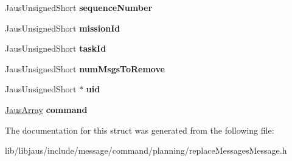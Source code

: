 \begin{DoxyCompactItemize}
\item 
\hypertarget{struct_replace_message_struct_ae1bb4943b97c73cb176e182298aaf50b}{\-Jaus\-Unsigned\-Short {\bfseries sequence\-Number}}\label{struct_replace_message_struct_ae1bb4943b97c73cb176e182298aaf50b}

\item 
\hypertarget{struct_replace_message_struct_a8dae45a6f79a463b52ede4d6227161a1}{\-Jaus\-Unsigned\-Short {\bfseries mission\-Id}}\label{struct_replace_message_struct_a8dae45a6f79a463b52ede4d6227161a1}

\item 
\hypertarget{struct_replace_message_struct_a88e5b48ac7c35fa597f0897cd65849b2}{\-Jaus\-Unsigned\-Short {\bfseries task\-Id}}\label{struct_replace_message_struct_a88e5b48ac7c35fa597f0897cd65849b2}

\item 
\hypertarget{struct_replace_message_struct_acf9e36b2a16694d00946b3d9d5988cbc}{\-Jaus\-Unsigned\-Short {\bfseries num\-Msgs\-To\-Remove}}\label{struct_replace_message_struct_acf9e36b2a16694d00946b3d9d5988cbc}

\item 
\hypertarget{struct_replace_message_struct_a9a5283f311e84e44daa6890b6cd9d042}{\-Jaus\-Unsigned\-Short $\ast$ {\bfseries uid}}\label{struct_replace_message_struct_a9a5283f311e84e44daa6890b6cd9d042}

\item 
\hypertarget{struct_replace_message_struct_a58a6da15a0347f1f577335357637f2cc}{\hyperlink{struct_jaus_array_struct}{\-Jaus\-Array} {\bfseries command}}\label{struct_replace_message_struct_a58a6da15a0347f1f577335357637f2cc}

\end{DoxyCompactItemize}


\-The documentation for this struct was generated from the following file\-:\begin{DoxyCompactItemize}
\item 
lib/libjaus/include/message/command/planning/replace\-Messages\-Message.\-h\end{DoxyCompactItemize}
